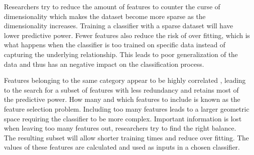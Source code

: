 Researchers try to reduce the amount of features to counter the curse of dimensionality which makes the dataset become more sparse as the dimensionality increases. Training a classifier with a sparse dataset will have lower predictive power. Fewer features also reduce the risk of over fitting, which is what happens when the classifier is too trained on specific data instead of capturing the underlying relationship. This leads to poor generalization of the data and thus has an negative impact on the classification process.

Features belonging to the same category appear to be highly correlated \cite{Xu201414}, leading to the search for a subset of features with less redundancy and retains most of the predictive power. How many and which features to include is known as the feature selection problem. Including too many features leads to a larger geometric space requiring the classifier to be more complex. Important information is lost when leaving too many features out, researchers try to find the right balance. The resulting subset will allow shorter training times and reduce over fitting. The values of these features are calculated and used as inputs in a chosen classifier.
